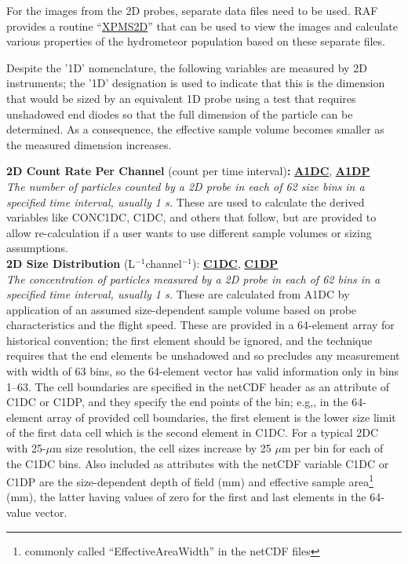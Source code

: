 For the images from the 2D probes, separate data files need to be
used. RAF provides a routine ``\href{https://www.eol.ucar.edu/software/xpms2d}{XPMS2D}''
that can be used to view the images and calculate various properties
of the hydrometeor population based on these separate  files.

\label{Despite-the-'1D'}Despite the '1D' nomenclature, the following
variables are measured by 2D instruments; the '1D' designation is
used to indicate that this is the dimension that would be sized by
an equivalent 1D probe using a test that requires unshadowed end diodes
so that the full dimension of the particle can be determined. As a
consequence, the effective sample volume becomes smaller as the measured
dimension increases.
\begin{hangparagraphs}
\textbf{2D Count Rate Per Channel }(count per time interval)\textbf{:}\textbf{
}\textbf{\uline{A1DC}}, \textbf{\uline{A1DP}}\\
\emph{The number of particles counted by a 2D
probe in each of 62 size bins in a specified time interval, usually
1 s.} These are used to calculate the derived variables like CONC1DC,
C1DC, and others that follow, but are provided to allow re-calculation
if a user wants to use different sample volumes or sizing assumptions.\\

\textbf{2D Size Distribution }(L$^{-1}$channel$^{-1}$):\textbf{
}\textbf{\uline{C1DC}}, \textbf{\uline{C1DP}}\\
\emph{The concentration of particles
measured by a 2D probe in each of 62 bins in a specified time interval,
usually 1 s.} These are calculated from A1DC by application of an
assumed size-dependent sample volume based on probe characteristics
and the flight speed. These are provided in a 64-element array for
historical convention; the first element should be ignored, and the
technique requires that the end elements be unshadowed and so precludes
any measurement with width of 63 bins, so the 64-element vector has
valid information only in bins 1--63. The cell boundaries are specified
in the netCDF header as an attribute of C1DC or C1DP, and they specify
the end points of the bin; e.g,, in the 64-element array of provided
cell boundaries, the first element is the lower size limit of the
first data cell which is the second element in C1DC. For a typical
2DC with 25-$\mu$m size resolution, the cell sizes increase by 25
$\mu$m per bin for each of the C1DC bins. Also included as attributes
with the netCDF variable C1DC or C1DP are the size-dependent depth
of field (mm) and effective sample area\footnote{commonly called ``EffectiveAreaWidth'' in the netCDF files}
(mm), the latter having values of zero for the first and last elements
in the 64-value vector. \\


\end{hangparagraphs}
